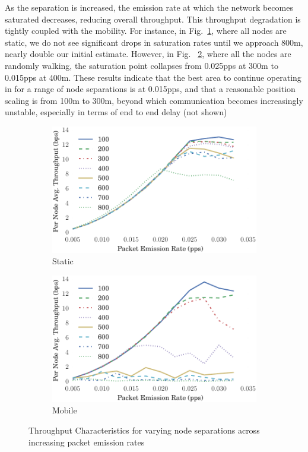 \documentclass[runningheads,a4paper]{llncs}
\begin{document}
As the separation is increased, the emission rate at which the network becomes saturated decreases, reducing overall throughput. 
This throughput degradation is tightly coupled with the mobility.
For instance, in Fig.~\ref{fig:throughput_static}, where all nodes are static, we do not see significant drops in saturation rates until we approach 800m, nearly double our initial estimate. 
However, in Fig. ~\ref{fig:throughput_all_mobile}, where all the nodes are randomly walking, the saturation point collapses from 0.025pps at 300m to 0.015pps at 400m.
These results indicate that the best area to continue operating in for a range of node separations is at 0.015pps, and that a reasonable position scaling is from 100m to 300m, beyond which communication becomes increasingly unstable, especially in terms of end to end delay (not shown) 
%
\begin{figure}[h]
\begin{subfigure}{.5\textwidth}
  \centering
  \includegraphics[width=.9\linewidth]{img/throughput_sep_lines_static.pdf}
  \caption{Static}
  \label{fig:throughput_static}
\end{subfigure}%
\begin{subfigure}{.5\textwidth}
\centering
  \includegraphics[width=.9\linewidth]{img/throughput_sep_lines_all_mobile.pdf}
  \caption{Mobile}
  \label{fig:throughput_all_mobile}
\end{subfigure}
\caption{Throughput Characteristics for varying node separations across increasing packet emission rates}
\label{fig:scenario_throughputs_plain}
\end{figure}
%
\end{document}
